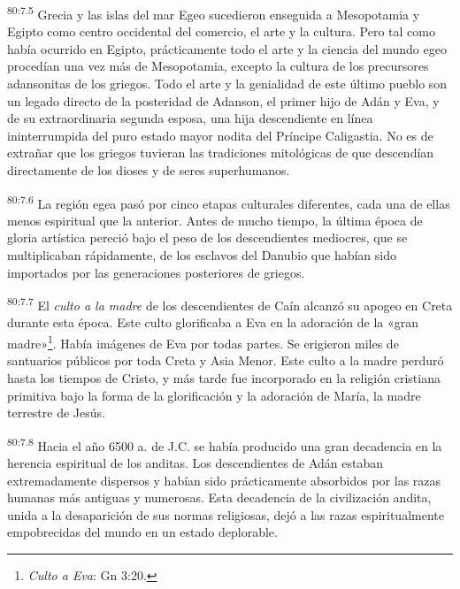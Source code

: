 \par
\textsuperscript{80:7.5} Grecia y las islas del mar Egeo sucedieron enseguida a Mesopotamia y Egipto como centro occidental del comercio, el arte y la cultura. Pero tal como había ocurrido en Egipto, prácticamente todo el arte y la ciencia del mundo egeo procedían una vez más de Mesopotamia, excepto la cultura de los precursores adansonitas de los griegos. Todo el arte y la genialidad de este último pueblo son un legado directo de la posteridad de Adanson, el primer hijo de Adán y Eva, y de su extraordinaria segunda esposa, una hija descendiente en línea ininterrumpida del puro estado mayor nodita del Príncipe Caligastia. No es de extrañar que los griegos tuvieran las tradiciones mitológicas de que descendían directamente de los dioses y de seres superhumanos.

\par
\textsuperscript{80:7.6} La región egea pasó por cinco etapas culturales diferentes, cada una de ellas menos espiritual que la anterior. Antes de mucho tiempo, la última época de gloria artística pereció bajo el peso de los descendientes mediocres, que se multiplicaban rápidamente, de los esclavos del Danubio que habían sido importados por las generaciones posteriores de griegos.

\par
\textsuperscript{80:7.7} El \textit{culto a la madre} de los descendientes de Caín alcanzó su apogeo en Creta durante esta época. Este culto glorificaba a Eva en la adoración de la «gran madre»\footnote{\textit{Culto a Eva}: Gn 3:20.}. Había imágenes de Eva por todas partes. Se erigieron miles de santuarios públicos por toda Creta y Asia Menor. Este culto a la madre perduró hasta los tiempos de Cristo, y más tarde fue incorporado en la religión cristiana primitiva bajo la forma de la glorificación y la adoración de María, la madre terrestre de Jesús.

\par
\textsuperscript{80:7.8} Hacia el año 6500 a. de J.C. se había producido una gran decadencia en la herencia espiritual de los anditas. Los descendientes de Adán estaban extremadamente dispersos y habían sido prácticamente absorbidos por las razas humanas más antiguas y numerosas. Esta decadencia de la civilización andita, unida a la desaparición de sus normas religiosas, dejó a las razas espiritualmente empobrecidas del mundo en un estado deplorable.

